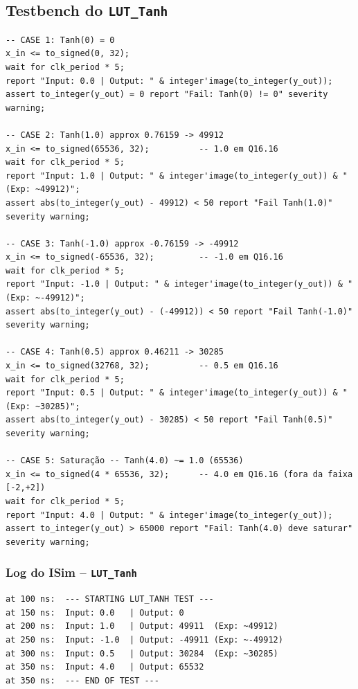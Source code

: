 \documentclass[a4paper,12pt]{article}
\begin{document}
\subsection{Testbench do \texttt{LUT\_Tanh}}

\begin{lstlisting}[style=vhdlstyle,
    caption={Testbench do \texttt{LUT\_Tanh} -- cinco casos de valida\c{c}\~ao.},
    label={lst:tb_tanh}]
-- CASE 1: Tanh(0) = 0
x_in <= to_signed(0, 32);
wait for clk_period * 5;
report "Input: 0.0 | Output: " & integer'image(to_integer(y_out));
assert to_integer(y_out) = 0 report "Fail: Tanh(0) != 0" severity warning;

-- CASE 2: Tanh(1.0) approx 0.76159 -> 49912
x_in <= to_signed(65536, 32);          -- 1.0 em Q16.16
wait for clk_period * 5;
report "Input: 1.0 | Output: " & integer'image(to_integer(y_out)) & " (Exp: ~49912)";
assert abs(to_integer(y_out) - 49912) < 50 report "Fail Tanh(1.0)" severity warning;

-- CASE 3: Tanh(-1.0) approx -0.76159 -> -49912
x_in <= to_signed(-65536, 32);         -- -1.0 em Q16.16
wait for clk_period * 5;
report "Input: -1.0 | Output: " & integer'image(to_integer(y_out)) & " (Exp: ~-49912)";
assert abs(to_integer(y_out) - (-49912)) < 50 report "Fail Tanh(-1.0)" severity warning;

-- CASE 4: Tanh(0.5) approx 0.46211 -> 30285
x_in <= to_signed(32768, 32);          -- 0.5 em Q16.16
wait for clk_period * 5;
report "Input: 0.5 | Output: " & integer'image(to_integer(y_out)) & " (Exp: ~30285)";
assert abs(to_integer(y_out) - 30285) < 50 report "Fail Tanh(0.5)" severity warning;

-- CASE 5: Saturação -- Tanh(4.0) ~= 1.0 (65536)
x_in <= to_signed(4 * 65536, 32);      -- 4.0 em Q16.16 (fora da faixa [-2,+2])
wait for clk_period * 5;
report "Input: 4.0 | Output: " & integer'image(to_integer(y_out));
assert to_integer(y_out) > 65000 report "Fail: Tanh(4.0) deve saturar" severity warning;
\end{lstlisting}

\subsubsection{Log do ISim -- \texttt{LUT\_Tanh}}

\begin{lstlisting}[style=logstyle,
    caption={Sa\'ida do ISim para o testbench do \texttt{LUT\_Tanh}.},
    label={lst:log_tanh}]
at 100 ns:  --- STARTING LUT_TANH TEST ---
at 150 ns:  Input: 0.0   | Output: 0
at 200 ns:  Input: 1.0   | Output: 49911  (Exp: ~49912)
at 250 ns:  Input: -1.0  | Output: -49911 (Exp: ~-49912)
at 300 ns:  Input: 0.5   | Output: 30284  (Exp: ~30285)
at 350 ns:  Input: 4.0   | Output: 65532
at 350 ns:  --- END OF TEST ---
\end{lstlisting}
\end{document}
